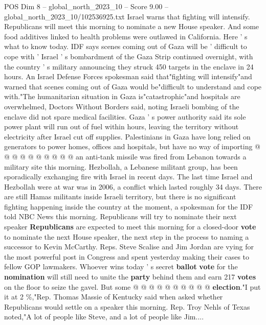 \begin{textsample}{POS Dim 8 – global\_north\_2023\_10 – Score 9.00 – global\_north\_2023\_10/102536925.txt}  \label{ex:f8_pos_241}
Israel warns that fighting will intensify.
Republicans will meet this morning to nominate a new House speaker.
And some food additives linked to health problems were outlawed in California.
Here ' s what to know today.
IDF says scenes coming out of Gaza will be ' difficult to cope with ' Israel ' s bombardment of the Gaza Strip continued overnight, with the country ' s military announcing they struck 450 targets in the enclave in 24 hours.
An Israel Defense Forces spokesman said that"fighting will intensify"and warned that scenes coming out of Gaza would be"difficult to understand and cope with."The humanitarian situation in Gaza is"catastrophic"and hospitals are overwhelmed, Doctors Without Borders said, noting Israeli bombing of the enclave did not spare medical facilities.
Gaza ' s power authority said its sole power plant will run out of fuel within hours, leaving the territory without electricity after Israel cut off supplies.
Palestinians in Gaza have long relied on generators to power homes, offices and hospitals, but have no way of importing @ @ @ @ @ @ @ @ @ @ an anti-tank missile was fired from Lebanon towards a military site this morning.
Hezbollah, a Lebanese militant group, has been sporadically exchanging fire with Israel in recent days.
The last time Israel and Hezbollah were at war was in 2006, a conflict which lasted roughly 34 days.
There are still Hamas militants inside Israeli territory, but there is no significant fighting happening inside the country at the moment, a spokesman for the IDF told NBC News this morning.
Republicans will try to nominate their next speaker \textbf{Republicans} are expected to meet this morning for a closed-door \textbf{vote} to nominate the next House speaker, the next step in the process to naming a successor to Kevin McCarthy.
Reps.
Steve Scalise and Jim Jordan are vying for the most powerful post in Congress and spent yesterday making their cases to fellow GOP lawmakers.
Whoever wins today ' s secret \textbf{ballot} \textbf{vote} for the \textbf{nomination} will still need to unite the \textbf{party} behind them and earn 217 \textbf{votes} on the floor to seize the gavel.
But some @ @ @ @ @ @ @ @ @ @ \textbf{election}."I put it at 2 \%,"Rep.
Thomas Massie of Kentucky said when asked whether Republicans would settle on a speaker this morning.
Rep.
Troy Nehls of Texas noted,"A lot of people like Steve, and a lot of people like Jim....

\end{textsample}
